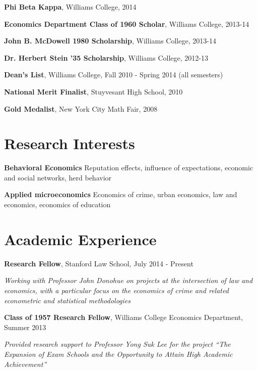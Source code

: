 \documentclass[margin,line]{res}
\begin{document}
\begin{resume}
\vspace*{-3.5mm}
{\bf Phi Beta Kappa}, Williams College, 2014

\vspace*{-3.5mm}
{\bf Economics Department Class of 1960 Scholar}, Williams College, 2013-14

\vspace*{-3.5mm}
{\bf John B. McDowell 1980 Scholarship}, Williams College, 2013-14

\vspace*{-3.5mm}
{\bf Dr. Herbert Stein '35 Scholarship}, Williams College, 2012-13

\vspace*{-3.5mm}
{\bf Dean's List}, Williams College, Fall 2010 - Spring 2014 (all semesters)

\vspace*{-3.5mm}
{\bf National Merit Finalist}, Stuyvesant High School, 2010

\vspace*{-3.5mm}
{\bf Gold Medalist}, New York City Math Fair, 2008

\section{\sc Research Interests}
{\bf Behavioral Economics} Reputation effects, influence of expectations, economic and social networks, herd behavior

\vspace{-.3cm}
{\bf Applied microeconomics} Economics of crime, urban economics, law and economics, economics of education

\section{\sc Academic Experience}
{\bf Research Fellow},  Stanford Law School, July 2014 - Present 

\vspace{-.43cm}
{\it Working with Professor John Donohue on projects at the intersection of law and economics, with a particular focus on the economics of crime and related econometric and statistical methodologies}

\vspace{-.1cm}
{\bf Class of 1957 Research Fellow},  Williams College Economics Department, Summer 2013 

\vspace{-.43cm}
{\it Provided research support to Professor Yong Suk Lee for the project ``The Expansion of Exam Schools and the Opportunity to Attain High Academic Achievement''}


\end{resume}
\end{document}
